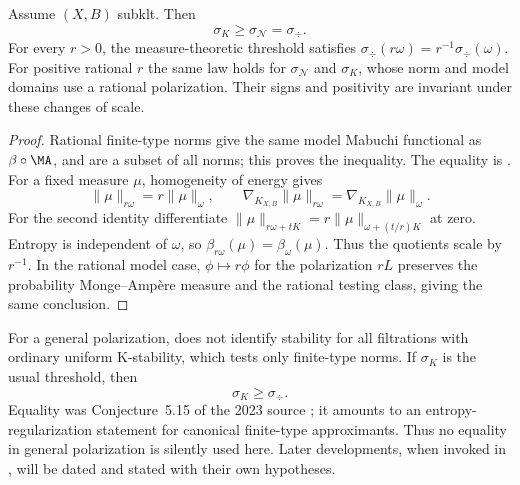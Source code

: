 \begin{proposition}
\label{prop:ch50-threshold-comparisons}
Assume $(X,B)$ subklt.  Then
\[
 \sigma_K\ge\sigma_{\mathcal N}=\sigma_{\div}.
\tag{50.79}\label{eq:ch50-threshold-chain}
\]
For every $r>0$, the measure-theoretic threshold satisfies
$\sigma_{\div}(r\omega)=r^{-1}\sigma_{\div}(\omega)$.
For positive rational $r$ the same law holds for $\sigma_{\mathcal N}$
and $\sigma_K$, whose norm and model domains use a rational polarization.
Their signs and positivity are invariant under these changes of scale.
\end{proposition}

\begin{proof}
Rational finite-type norms give the same model Mabuchi functional as
$\beta\circ\MA$, and are a subset of all norms; this proves the
inequality.  The equality is .
For a fixed measure $\mu$, homogeneity of energy gives
\[
 \|\mu\|_{r\omega}=r\|\mu\|_\omega,
 \qquad
 \nabla_{K_{X,B}}\|\mu\|_{r\omega}
       =\nabla_{K_{X,B}}\|\mu\|_\omega.
\]
For the second identity differentiate
$\|\mu\|_{r\omega+tK}=r\|\mu\|_{\omega+(t/r)K}$ at zero.
Entropy is independent of $\omega$, so $\beta_{r\omega}(\mu)=\beta_\omega(\mu)$.
Thus the quotients scale by $r^{-1}$.  In the rational model case,
$\phi\mapsto r\phi$ for the polarization $rL$ preserves the
probability Monge--Amp\`ere measure and the rational testing class,
giving the same conclusion.
\end{proof}

\begin{remark}
\label{rem:stability-gap-general-polarization}
For a general polarization, 
does not identify stability for all filtrations with ordinary uniform
K-stability, which tests only finite-type norms.  If
$\sigma_K$ is the usual threshold, then
\[
                         \sigma_K\geq\sigma_{\div}.
\tag{50.80}\label{eq:stability-threshold-inequality}
\]
Equality was Conjecture~5.15 of the 2023 source \cite{BJKS2}; it amounts to
an entropy-regularization statement for canonical finite-type
approximants.  Thus no equality in general polarization is silently used
here.  Later developments, when invoked in
, will be dated
and stated with their own hypotheses.
\end{remark}

